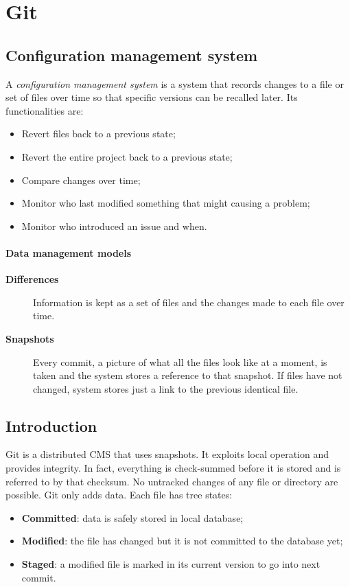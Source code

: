 \section{Git}
\subsection{Configuration management system}
A \emph{configuration management system} is a system that records changes to a file or set of files over time so that specific versions can be recalled later. Its functionalities are:
\begin{itemize}
\item Revert files back to a previous state;
\item Revert the entire project back to a previous state;
\item Compare changes over time;
\item Monitor who last modified something that might causing a problem;
\item Monitor who introduced an issue and when.
\end{itemize}

\paragraph{Data management models}
\begin{description}
\item [\textbf{Differences}] Information is kept as a set of files and the changes made to each file over time.
\item [\textbf{Snapshots}] Every commit, a picture of what all the files look like at a moment, is taken and the system stores a reference to that snapshot. If files have not changed, system stores just a link to the previous identical file.
\end{description}

\subsection{Introduction}
Git is a distributed CMS that uses snapshots. It exploits local operation and provides integrity. In fact, everything is check-summed before it is stored and is referred to by that checksum. No untracked changes of any file or directory are possible. Git only adds data. Each file has tree states:
\begin{itemize}
\item \textbf{Committed}: data is safely stored in local database;
\item \textbf{Modified}: the file has changed but it is not committed to the database yet;
\item \textbf{Staged}: a modified file is marked in its current version to go into next commit.
\end{itemize}

